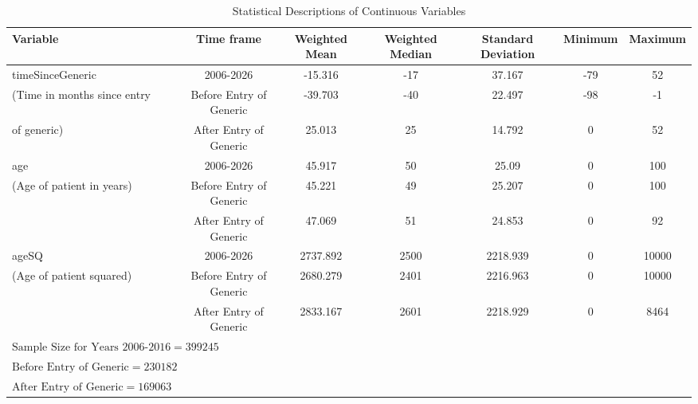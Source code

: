 \begin{table}[htbp]\centering
\def\sym#1{\ifmmode^{#1}\else\(^{#1}\)\fi}
\caption{Statistical Descriptions of Continuous Variables\label{tab1}}
\begin{tabular}{l*{6}{c}}
\hline\hline
            Variable&\multicolumn{1}{c}{Time frame}&\multicolumn{1}{c}{Weighted Mean}&\multicolumn{1}{c}{Weighted Median}&\multicolumn{1}{c}{Standard Deviation}&\multicolumn{1}{c}{Minimum}&\multicolumn{1}{c}{Maximum}\\
\hline
timeSinceGeneric                    &     2006-2026&             -15.316&    -17&   37.167&     -79&  52\\
(Time in months since entry &     Before Entry of Generic&     -39.703&    -40&    22.497 &     -98&  -1\\
 of generic)   &     After Entry of Generic&       25.013 &    25&      14.792&     0&  52\\
[1em]
age                                 &     2006-2026&             45.917&    50&    25.09 &     0&  100\\
(Age of patient in years)           &     Before Entry of Generic&     45.221&    49&    25.207&     0&  100\\
                                    &     After Entry of Generic&      47.069&    51&    24.853&     0&  92\\
[1em]
ageSQ                               &     2006-2026&             2737.892&    2500&  2218.939&     0&  10000\\
(Age of patient squared)   &     Before Entry of Generic&    2680.279&    2401&  2216.963 &     0&  10000\\
                                    &     After Entry of Generic&      2833.167&    2601&  2218.929 &     0&  8464\\
\hline
$\text{Sample Size for Years 2006-2016} = 399245$\\
$\text{Before Entry of Generic} = 230182$\\
$\text{After Entry of Generic} = 169063$\\
\hline\hline

\end{tabular}
\label{tab:Table4.2}
\end{table}
